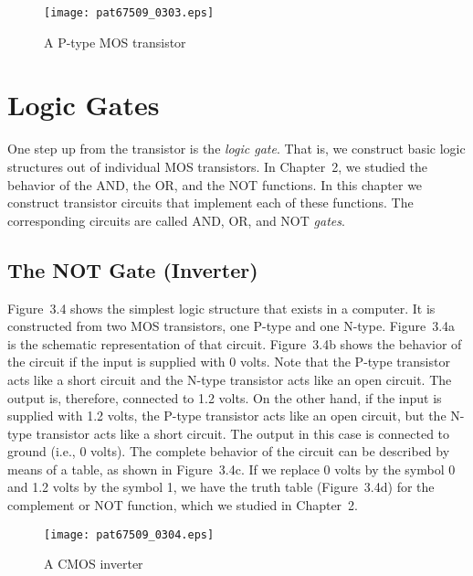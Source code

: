 \documentclass{patt}
\begin{document}
\begin{figure}
\centerline{\texttt{[image: pat67509\_0303.eps]}}
\caption{A P-type MOS transistor}
\label{fig:pmos}
\vspace{3pt}
\end{figure}

\vspace{-6pt}

\section{Logic Gates}

One step up from the transistor is the {\em logic gate}.  That is, we
construct basic logic structures out of individual MOS transistors.
In Chapter~2, we studied the behavior of the AND, the OR, and the NOT
functions.  In this chapter we construct transistor circuits that
implement each of these functions.  The corresponding circuits are
called AND, OR, and NOT {\em gates}.

\vspace{3pt}

\subsection{The NOT Gate (Inverter)}

Figure~3.4 shows the simplest logic structure that exists in a
computer.  It is constructed from two MOS transistors, one P-type and
one N-type.  Figure~3.4a is the schematic representation of that
circuit.  Figure~3.4b shows the behavior of the circuit if the input
is supplied with 0 volts.  Note that the P-type transistor acts like a
short circuit and the N-type transistor acts like an open circuit.  
The output is, therefore,
connected to 1.2 volts.  On the other hand, if the input is supplied
with 1.2 volts, the P-type transistor acts like an open circuit, but the N-type
transistor acts like a short circuit.  The output in this case is connected to
ground (i.e., 0 volts).  The complete behavior of the circuit can be
described by means of a table, as shown in Figure~3.4c.  If we replace
0 volts by the symbol 0 and 1.2 volts by the symbol 1, we have the
truth table (Figure~3.4d) for the complement or NOT function, which we
studied in Chapter~2.

\begin{figure}
\centerline{\texttt{[image: pat67509\_0304.eps]}}
\caption{A CMOS inverter}
\label{fig:inverter}
\end{figure}
\end{document}
